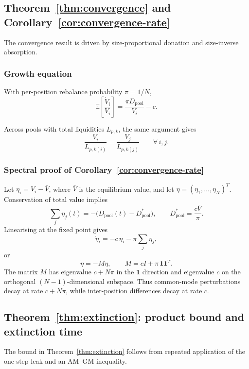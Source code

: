 \documentclass[11pt,a4paper]{article}
\theoremstyle{plain}
\begin{document}
\subsection{Theorem~\ref{thm:convergence} and Corollary~\ref{cor:convergence-rate}}

The convergence result is driven by size-proportional donation and size-inverse absorption.

\subsubsection*{Growth equation}

With per-position rebalance probability $\pi = 1/N$,
\begin{equation}\label{eq:growth-app}
\mathbb{E}\!\left[\frac{\dot{V}_i}{V_i}\right]
=
\frac{\pi D_{\text{pool}}}{V_i} - c.
\end{equation}

Across pools with total liquidities $L_{p,k}$, the same argument gives
\begin{equation}\label{eq:multipool-app}
\frac{V_i}{L_{p,k(i)}}
=
\frac{V_j}{L_{p,k(j)}}
\qquad \forall\, i,j.
\end{equation}

\subsubsection*{Spectral proof of Corollary~\ref{cor:convergence-rate}}

Let $\eta_i = V_i - \bar V$, where $\bar V$ is the equilibrium value, and let $\eta = (\eta_1, \ldots, \eta_N)^T$. Conservation of total value implies
\[
\sum_j \eta_j(t) = -\bigl(D_{\text{pool}}(t) - D_{\text{pool}}^*\bigr),
\qquad
D_{\text{pool}}^* = \frac{c\bar V}{\pi}.
\]
Linearising at the fixed point gives
\[
\dot\eta_i = -c\,\eta_i - \pi \sum_j \eta_j,
\]
or
\[
\dot\eta = -M\eta,
\qquad
M = cI + \pi\,\mathbf{1}\mathbf{1}^T.
\]
The matrix $M$ has eigenvalue $c + N\pi$ in the $\mathbf{1}$ direction and eigenvalue $c$ on the orthogonal $(N-1)$-dimensional subspace. Thus common-mode perturbations decay at rate $c + N\pi$, while inter-position differences decay at rate $c$.

\subsection{Theorem~\ref{thm:extinction}: product bound and extinction time}

The bound in Theorem~\ref{thm:extinction} follows from repeated application of the one-step leak and an AM--GM inequality.
\end{document}

